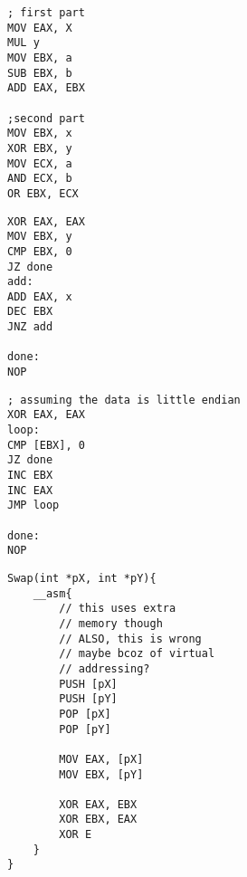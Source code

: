 \documentclass[11pt,letterpaper]{article}
\begin{document}

\begin{verbatim}
; first part
MOV EAX, X
MUL y
MOV EBX, a
SUB EBX, b
ADD EAX, EBX

;second part
MOV EBX, x
XOR EBX, y
MOV ECX, a
AND ECX, b
OR EBX, ECX
\end{verbatim}

\pagebreak
{}
\begin{verbatim}
XOR EAX, EAX
MOV EBX, y
CMP EBX, 0
JZ done
add:	
ADD EAX, x
DEC EBX
JNZ add

done:
NOP
\end{verbatim}
\begin{verbatim}
; assuming the data is little endian
XOR EAX, EAX
loop: 
CMP [EBX], 0
JZ done
INC EBX
INC EAX
JMP loop

done:
NOP
\end{verbatim}

\begin{verbatim}
Swap(int *pX, int *pY){
	__asm{
		// this uses extra
		// memory though
		// ALSO, this is wrong
		// maybe bcoz of virtual
		// addressing?
		PUSH [pX]
		PUSH [pY]
		POP [pX]
		POP [pY]

		MOV EAX, [pX]
		MOV EBX, [pY]

		XOR EAX, EBX
		XOR EBX, EAX
		XOR E
	}
}
\end{verbatim}
\end{document}
